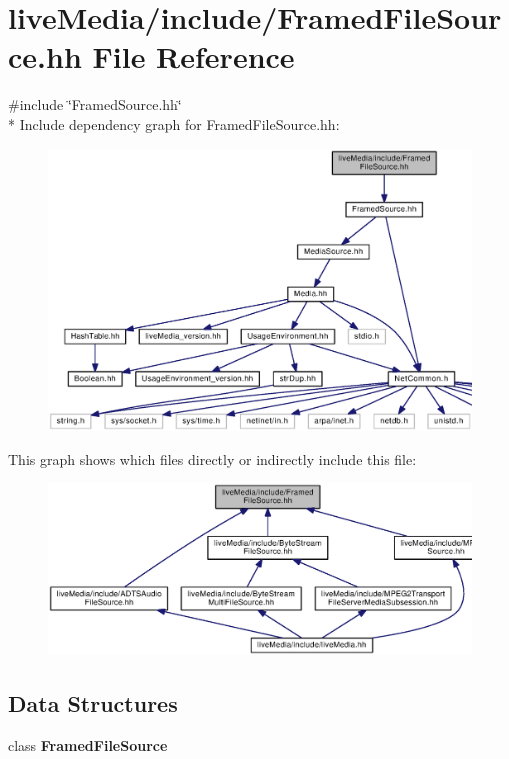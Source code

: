 \section{live\+Media/include/\+Framed\+File\+Source.hh File Reference}
\label{FramedFileSource_8hh}
{\ttfamily \#include \char`\"{}Framed\+Source.\+hh\char`\"{}}\\*
Include dependency graph for Framed\+File\+Source.\+hh\+:
\nopagebreak
\begin{figure}[H]
\begin{center}
\leavevmode
\includegraphics[width=350pt]{FramedFileSource_8hh__incl}
\end{center}
\end{figure}
This graph shows which files directly or indirectly include this file\+:
\nopagebreak
\begin{figure}[H]
\begin{center}
\leavevmode
\includegraphics[width=350pt]{FramedFileSource_8hh__dep__incl}
\end{center}
\end{figure}
\subsection*{Data Structures}
\begin{DoxyCompactItemize}
\item 
class {\bf Framed\+File\+Source}
\end{DoxyCompactItemize}
